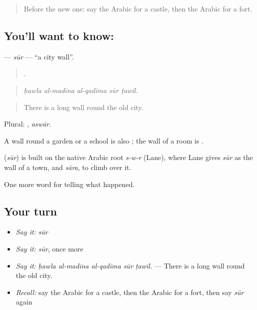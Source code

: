 \label{lesson:AR-C322-sur}



\begin{quote}
Before the new one: say the Arabic for a castle, then the Arabic for a fort.
\end{quote}

\subsection*{You'll want to know: }
\textbf{} — \emph{sūr} — \textquotedblleft{}a city wall\textquotedblright{}.

\begin{quote}
    .
\end{quote}

\begin{quote}
\emph{ḥawla al-madīna al-qadīma sūr ṭawīl.}
\end{quote}

\begin{quote}
There is a long wall round the old city.
\end{quote}

Plural: , \emph{aswār}.

A wall round a garden or a school is also ; the wall of a room is .

\begin{cousinweb}
\textbf{} (\emph{sūr}) is built on the native Arabic root \emph{s-w-r} (Lane), where Lane gives \emph{sūr} as the wall of a town, and \emph{sāra}, to climb over it.
\end{cousinweb}

\begin{grammarlens}[title={What you've built}]
One more word for telling what happened.
\end{grammarlens}

\subsection*{Your turn}
\begin{itemize}
\raggedright
  \item \emph{Say it:} \emph{sūr}
  \item \emph{Say it:} \emph{sūr}, once more
  \item \emph{Say it:} \emph{ḥawla al-madīna al-qadīma sūr ṭawīl.} — There is a long wall round the old city.
  \item \emph{Recall:} say the Arabic for a castle, then the Arabic for a fort, then say \emph{sūr} again
\end{itemize}

